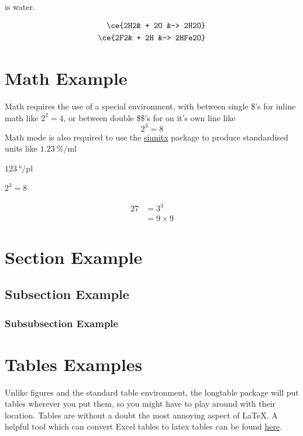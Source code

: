 
 is water. 


\begin{align}
  \ce{2H2& + 2O &-> 2H2O} \\
  \ce{2F2& + 2H &-> 2HFe2O}
\end{align}


\section{Math Example}
Math requires the use of a special environment, with between single \$'s for inline math like $2^2=4$, or between double \$\$'s for on it's own line like $$2^3=8$$ Math mode is also required to use the \href{https://mirror.aarnet.edu.au/pub/CTAN/macros/latex/contrib/siunitx/siunitx.pdf}{siunitx} package to produce standardised units like $\SI{1.23}{\percent\per\milli\litre}$

$\SI{123}{\degree\per\pico\litre}$

\begin{math}
  2^3=8
\end{math}

\begin{align}
  27 &= 3^3 \\
  &= 9 \times 9
\end{align}
\section{Section Example}\label{sec:section_Example}
\subsection{Subsection Example}
\subsubsection{Subsubsection Example}


\section{Tables Examples}
Unlike figures and the standard table environment, the longtable package will put tables wherever you put them, so you might have to play around with their location. Tables are without a doubt the most annoying aspect of \LaTeX. A helpful tool which can convert Excel tables to latex tables can be found \href{https://github.com/krlmlr/Excel2LaTeX}{here}.

